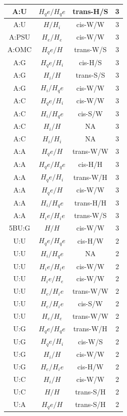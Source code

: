 \begin{center}
\begin{longtable}{c|c|c|c}
A:U & $H_qe/H_qe$ & trans-H/S & 3 \\  \hline
A:U & $H/H_i$ & cis-W/W & 3 \\  \hline
A:PSU & $H_e/H_e$ & cis-W/W & 3 \\  \hline
A:OMC & $H_qe/H$ & trans-W/S & 3 \\  \hline
A:G & $H_qe/H_i$ & cis-H/S & 3 \\  \hline
A:G & $H_i/H$ & trans-S/S & 3 \\  \hline
A:G & $H_i/H_qe$ & cis-W/W & 3 \\  \hline
A:C & $H_qe/H_i$ & cis-W/W & 3 \\  \hline
A:C & $H_i/H_qe$ & cis-S/W & 3 \\  \hline
A:C & $H_i/H$ & NA & 3 \\  \hline
A:C & $H_i/H_i$ & NA & 3 \\  \hline
A:A & $H_qe/H$ & trans-W/W & 3 \\  \hline
A:A & $H_qe/H_qe$ & cis-H/H & 3 \\  \hline
A:A & $H_qe/H_i$ & trans-W/H & 3 \\  \hline
A:A & $H_qe/H$ & cis-W/W & 3 \\  \hline
A:A & $H_i/H_qe$ & trans-H/H & 3 \\  \hline
A:A & $H_ie/H_ie$ & trans-W/S & 3 \\  \hline
5BU:G & $H/H$ & cis-W/W & 3 \\  \hline
U:U & $H_qe/H_qe$ & cis-H/W & 2 \\  \hline
U:U & $H_i/H_qe$ & NA & 2 \\  \hline
U:U & $H_ie/H_ie$ & cis-W/W & 2 \\  \hline
U:U & $H_ie/H_e$ & cis-W/W & 2 \\  \hline
U:U & $H_e/H_ie$ & trans-W/W & 2 \\  \hline
U:U & $H_e/H_ie$ & cis-S/W & 2 \\  \hline
U:U & $H_e/H_e$ & trans-W/W & 2 \\  \hline
U:G & $H_qe/H_qe$ & trans-W/H & 2 \\  \hline
U:G & $H_qe/H_i$ & cis-W/S & 2 \\  \hline
U:G & $H_i/H$ & cis-W/W & 2 \\  \hline
U:G & $H_e/H_ie$ & cis-H/W & 2 \\  \hline
U:C & $H_i/H$ & cis-W/W & 2 \\  \hline
U:C & $H/H$ & trans-S/H & 2 \\  \hline
U:A & $H_qe/H$ & trans-S/H & 2 \\  \hline

\end{longtable}
\end{center}
